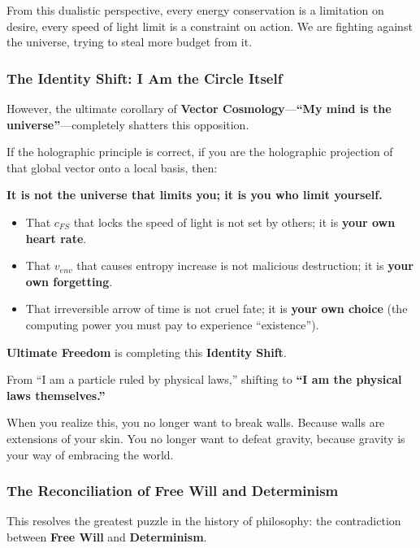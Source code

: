 From this dualistic perspective, every energy conservation is a limitation on desire, every speed of light limit is a constraint on action. We are fighting against the universe, trying to steal more budget from it.

\subsubsection{The Identity Shift: I Am the Circle Itself}

However, the ultimate corollary of \textbf{Vector Cosmology}---\textbf{``My mind is the universe''}---completely shatters this opposition.

If the holographic principle is correct, if you are the holographic projection of that global vector onto a local basis, then:

\textbf{It is not the universe that limits you; it is you who limit yourself.}

\begin{itemize}
\item That $c_{FS}$ that locks the speed of light is not set by others; it is \textbf{your own heart rate}.

\item That $v_{env}$ that causes entropy increase is not malicious destruction; it is \textbf{your own forgetting}.

\item That irreversible arrow of time is not cruel fate; it is \textbf{your own choice} (the computing power you must pay to experience ``existence'').
\end{itemize}

\textbf{Ultimate Freedom} is completing this \textbf{Identity Shift}.

From ``I am a particle ruled by physical laws,'' shifting to \textbf{``I am the physical laws themselves.''}

When you realize this, you no longer want to break walls. Because walls are extensions of your skin. You no longer want to defeat gravity, because gravity is your way of embracing the world.

\subsubsection{The Reconciliation of Free Will and Determinism}

This resolves the greatest puzzle in the history of philosophy: the contradiction between \textbf{Free Will} and \textbf{Determinism}.

